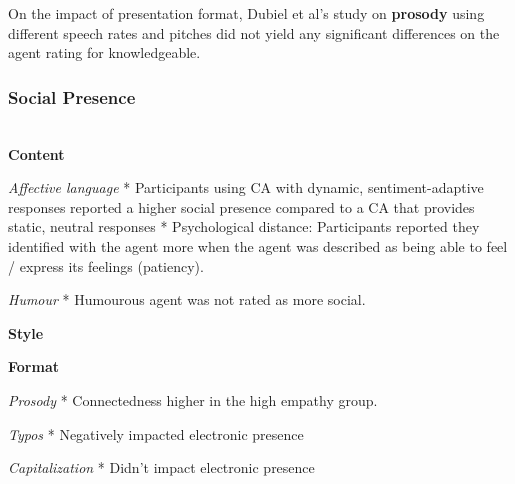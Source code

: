 \documentclass[sigconf,screen,review, anonymous]{acmart}
\newcommand{\cmt}[1]{}%
\begin{document}
%



On the impact of presentation format, Dubiel et al's study on \textbf{prosody} using different speech rates and pitches did not yield any significant differences on the agent rating for knowledgeable.

%


\subsubsection{Social Presence \nopunct}
\hfill\\

\textbf{Content}

\textit{Affective language}
* Participants using CA with dynamic, sentiment-adaptive responses reported a higher social presence compared to a CA that provides static, neutral responses \cite{diederich2019emulating}\cmt{[25]}
* Psychological distance: Participants reported they identified with the agent more when the agent was described as being able to feel / express its feelings (patiency). \cite{lee2019s}\cmt{[55]}


\textit{Humour}
* Humourous agent was not rated as more social. \cite{ceha2021can}\cmt{[57]}

%
\textbf{Style}


%
\textbf{Format}

\textit{Prosody}
* Connectedness higher in the high empathy group. \cite{kim2020can}\cmt{[24]}

\textit{Typos}
* Negatively impacted electronic presence \cite{westerman2019believe}\cmt{[9]}

\textit{Capitalization}
* Didn't impact electronic presence \cite{westerman2019believe}\cmt{[9]}
\end{document}
